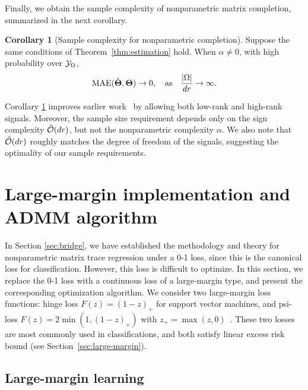 \documentclass[aos]{imsart}
\theoremstyle{definition}
\newtheorem{corollary}{Corollary}
\begin{document}
Finally, we obtain the sample complexity of nonparametric matrix completion, summarized in the next corollary.

\begin{corollary}[Sample complexity for nonparametric completion] \label{thm:sample-complexity}
Suppose the same conditions of Theorem~\ref{thm:estimation} hold. When $\alpha\neq 0$, with high probability over $\mathcal{Y}_\Omega$, 
\begin{equation*}
\textup{MAE}(\hat \mTheta, \mTheta)\to 0, \quad \text{as}\quad {|\Omega|\over {d} r}\to \infty.
\end{equation*}
\end{corollary}

\noindent
Corollary \ref{thm:sample-complexity} improves earlier work~\cite{yuan2016tensor, pmlr-v119-lee20i} by allowing both low-rank and high-rank signals. Moreover, the sample size requirement depends only on the sign complexity $\tilde {\mathcal{O}}(dr)$, but not the nonparametric complexity $\alpha$. We also note that $\tilde {\mathcal{O}}(dr)$ roughly matches the degree of freedom of the signals, suggesting the optimality of our sample requirements.





\section{Large-margin implementation and ADMM algorithm}
\label{sec:estimation}

In Section \ref{sec:bridge}, we have established the methodology and theory for nonparametric matrix trace regression under a 0-1 loss, since this is the canonical loss for classification. However, this loss is difficult to optimize. In this section, we replace the 0-1 loss with a continuous loss of a large-margin type, and present the corresponding optimization algorithm. We consider two large-margin loss functions: hinge loss $F(z) = (1-z)_+$ for support vector machines, and psi-loss $F(z)=2\min(1,(1-z)_+)$ with $z_{+}=\max(z,0)$~\cite{shen2003psi}. These two losses are most commonly used in classifications, and both satisfy linear excess risk bound (see Section~\ref{sec:large-margin}). 



\subsection{Large-margin learning} 
\end{document}
